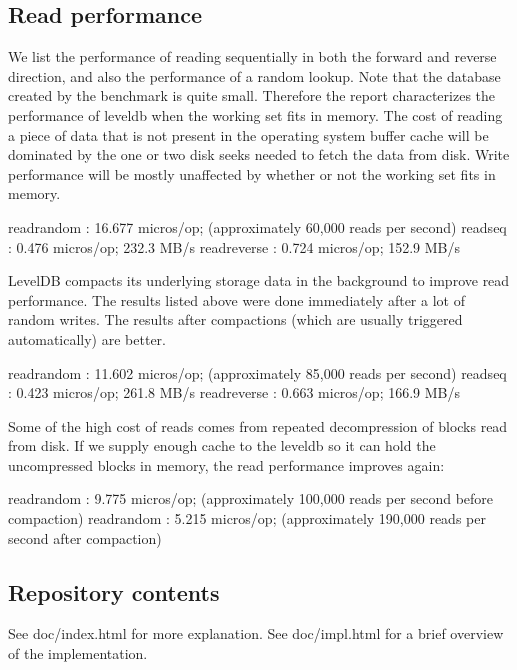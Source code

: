 \subsection*{Read performance}

We list the performance of reading sequentially in both the forward and reverse direction, and also the performance of a random lookup. Note that the database created by the benchmark is quite small. Therefore the report characterizes the performance of leveldb when the working set fits in memory. The cost of reading a piece of data that is not present in the operating system buffer cache will be dominated by the one or two disk seeks needed to fetch the data from disk. Write performance will be mostly unaffected by whether or not the working set fits in memory. \begin{DoxyVerb}readrandom   :      16.677 micros/op;  (approximately 60,000 reads per second)
readseq      :       0.476 micros/op;  232.3 MB/s
readreverse  :       0.724 micros/op;  152.9 MB/s
\end{DoxyVerb}


Level\+DB compacts its underlying storage data in the background to improve read performance. The results listed above were done immediately after a lot of random writes. The results after compactions (which are usually triggered automatically) are better. \begin{DoxyVerb}readrandom   :      11.602 micros/op;  (approximately 85,000 reads per second)
readseq      :       0.423 micros/op;  261.8 MB/s
readreverse  :       0.663 micros/op;  166.9 MB/s
\end{DoxyVerb}


Some of the high cost of reads comes from repeated decompression of blocks read from disk. If we supply enough cache to the leveldb so it can hold the uncompressed blocks in memory, the read performance improves again\+: \begin{DoxyVerb}readrandom   :       9.775 micros/op;  (approximately 100,000 reads per second before compaction)
readrandom   :       5.215 micros/op;  (approximately 190,000 reads per second after compaction)
\end{DoxyVerb}


\subsection*{Repository contents}

See doc/index.\+html for more explanation. See doc/impl.\+html for a brief overview of the implementation.

